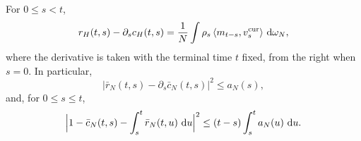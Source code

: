 \begin{lemma}\label{lem:finite-dimensional-fdt}
For $0\le s<t$,
\begin{equation}
 r_H(t,s)-\partial_sc_H(t,s)
 =\frac1N\int\rho_s\left\langle m_{t-s},v^{\mathrm{cur}}_s\right\rangle\,\mathop{}\!\mathrm d\omega_N,
 \label{eq:quenched-fdt-current}
\end{equation}
where the derivative is taken with the terminal time $t$ fixed, from the right when $s=0$. In particular,
\begin{equation}
 |\bar r_N(t,s)-\partial_s\bar c_N(t,s)|^2\le a_N(s),
 \label{eq:annealed-fdt-bound}
\end{equation}
and, for $0\le s\le t$,
\begin{equation}
 \Bigl|1-\bar c_N(t,s)-\int_s^t\bar r_N(t,u)\,\mathop{}\!\mathrm d u\Bigr|^2
 \le(t-s)\int_s^ta_N(u)\,\mathop{}\!\mathrm d u.
 \label{eq:finite-dimensional-integrated-fdt}
\end{equation}
\end{lemma}

